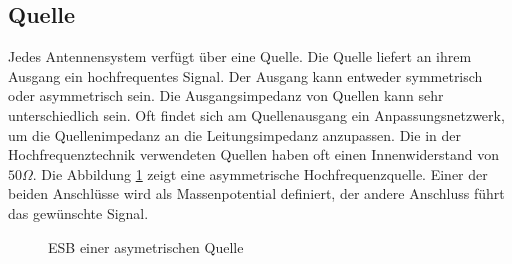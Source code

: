 \subsection{Quelle}
Jedes Antennensystem verfügt über eine Quelle.  Die Quelle liefert an ihrem Ausgang ein hochfrequentes Signal. Der Ausgang kann entweder symmetrisch oder asymmetrisch sein. Die Ausgangsimpedanz von Quellen kann sehr unterschiedlich sein. Oft findet sich am Quellenausgang ein Anpassungsnetzwerk, um die Quellenimpedanz an die Leitungsimpedanz anzupassen. Die in der Hochfrequenztechnik verwendeten Quellen haben oft einen Innenwiderstand von $50\Omega$. Die Abbildung \ref{fig:asymetrischeQuelle} zeigt eine asymmetrische  Hochfrequenzquelle. Einer der beiden Anschlüsse wird als Massenpotential definiert, der andere Anschluss führt das gewünschte Signal. 
\begin{figure}[h]
	\begin{center}
	\end{center}
\caption{ESB einer asymetrischen Quelle}
\label{fig:asymetrischeQuelle}
\end{figure}

